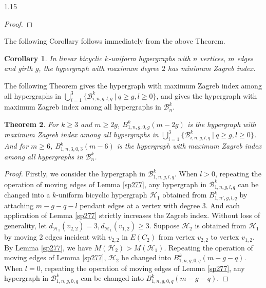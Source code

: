 \documentclass[preprint,12pt]{elsarticle1}
\newtheorem{thm}{Theorem}[section]
\newtheorem{cor}[thm]{Corollary}
\numberwithin{equation}{section}
\begin{document}
\begin{spacing}{1.15}
\begin{proof}
\end{proof}

The following Corollary follows immediately from the above Theorem.
\begin{cor}
In linear bicyclic $k$-uniform hypergraphs with $n$ vertices, $m$ edges and girth $g$, the hypergraph with maximum degree $2$ has minimum Zagreb index.
\end{cor}


The following Theorem
gives the hypergraph with maximum Zagreb index among all hypergraphs in $\bigcup_{i=1}^{3}\{\mathcal{B}_{i,n,g,l,q}^{k}~|~q\geq g,l\geq 0\}$, and
gives the hypergraph with maximum Zagreb index among all hypergraphs in $\mathcal{B}_{n}^{k}$.
\begin{thm}
For $k\geq3$ and $m\geq 2g$, $B_{1,n,g,0,g}^{k}(m-2g)$ is the hypergraph with maximum Zagreb index among all hypergraphs in $\bigcup_{i=1}^{3}\{\mathcal{B}_{i,n,g,l,q}^{k}~|~q\geq g,l\geq 0\}$.
And for $m\geq6$,
$B_{1,n,3,0,3}^{k}(m-6)$ is the hypergraph with maximum Zagreb index among all  hypergraphs in $\mathcal{B}_{n}^{k}$.
\end{thm}
\begin{proof}


Firstly, we consider the hypergraph  in $\mathcal{B}_{1,n,g,l,q}^{k}$. When $l>0$,
repeating the operation of moving edges of Lemma \ref{sp277}, any hypergraph in $\mathcal{B}_{1,n,g,l,q}^{k}$ can be changed into a $k$-uniform bicyclic hypergraph $\mathcal{H}_{1}$
obtained from $B_{1,n',g,l,q}^{k}$ by attaching $m-g-q-l$ pendant edges at a vertex with degree 3.
And each application of Lemma \ref{sp277} strictly increases the Zagreb index. Without loss of generality, let $d_{\mathcal{H}_{1}}(v_{2,2})=3, d_{\mathcal{H}_{1}}(v_{1,2})\geq3$.
Suppose $\mathcal{H}_{2}$ is obtained from $\mathcal{H}_{1}$ by moving 2 edges incident with $v_{2,2}$ in $E(C_{2})$
from vertex $v_{2,2}$ to vertex $v_{1,2}$. By Lemma \ref{sp277}, we have $M(\mathcal{H}_{2})>M(\mathcal{H}_{1})$.
Repeating the operation of moving edges of Lemma \ref{sp277}, $\mathcal{H}_{2}$ be changed into $B_{1,n,g,0,q}^{k}(m-g-q)$.
When $l=0$, repeating the operation of moving edges of Lemma \ref{sp277}, any hypergraph in $\mathcal{B}_{1,n,g,0,q}^{k}$ can be changed into $B_{1,n,g,0,q}^{k}(m-g-q)$.


\end{proof}
\end{spacing}
\end{document}
